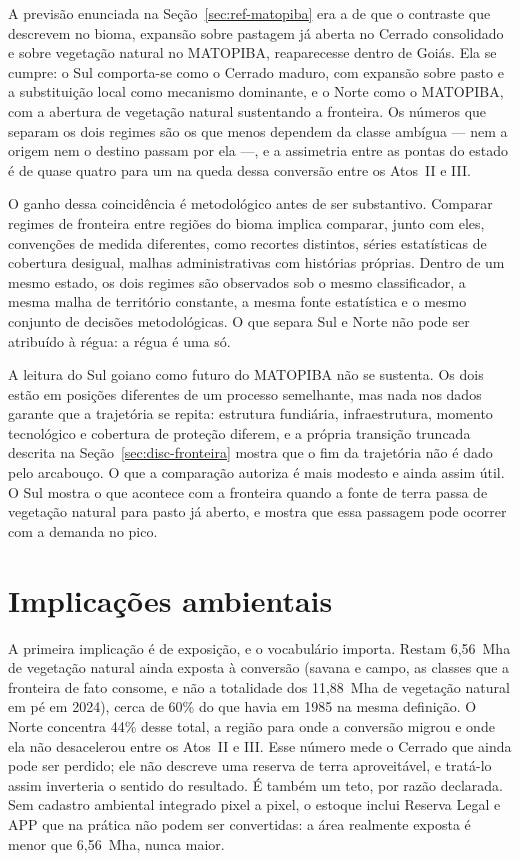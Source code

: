 A previsão enunciada na Seção~\ref{sec:ref-matopiba} era a de que o contraste
que  descrevem no bioma, expansão sobre pastagem
já aberta no Cerrado consolidado e sobre vegetação natural no MATOPIBA,
reaparecesse dentro de Goiás. Ela se cumpre: o Sul comporta-se como o Cerrado
maduro, com expansão sobre pasto e a substituição local como mecanismo
dominante, e o Norte como o MATOPIBA, com a abertura de vegetação natural
sustentando a fronteira. Os números que separam os dois regimes são os que
menos dependem da classe ambígua --- nem a origem nem o destino passam por ela
---, e a assimetria entre as pontas do estado é de quase quatro para um na
queda dessa conversão entre os Atos~II e III.

O ganho dessa coincidência é metodológico antes de ser substantivo. Comparar
regimes de fronteira entre regiões do bioma implica comparar, junto com eles,
convenções de medida diferentes, como recortes distintos, séries estatísticas
de cobertura desigual, malhas administrativas com histórias próprias. Dentro
de um mesmo estado, os dois regimes são observados sob o mesmo classificador,
a mesma malha de território constante, a mesma fonte estatística e o mesmo
conjunto de decisões metodológicas. O que separa Sul e Norte não pode ser
atribuído à régua: a régua é uma só.

A leitura do Sul goiano como futuro do MATOPIBA não se sustenta. Os dois estão
em posições diferentes de um processo semelhante, mas nada nos dados garante
que a trajetória se repita: estrutura fundiária, infraestrutura, momento
tecnológico e cobertura de proteção diferem, e a própria transição truncada
descrita na Seção~\ref{sec:disc-fronteira} mostra que o fim da trajetória não
é dado pelo arcabouço. O que a comparação autoriza é mais modesto e ainda
assim útil. O Sul mostra o que acontece com a fronteira quando a fonte de
terra passa de vegetação natural para pasto já aberto, e mostra que essa
passagem pode ocorrer com a demanda no pico.

\section{Implicações ambientais}
\label{sec:disc-ambiental}

A primeira implicação é de exposição, e o vocabulário importa. Restam 6,56~Mha
de vegetação natural ainda exposta à conversão (savana e campo, as classes que
a fronteira de fato consome, e não a totalidade dos 11,88~Mha de vegetação
natural em pé em 2024), cerca de 60\% do que havia em 1985 na mesma definição.
O Norte concentra 44\% desse total, a região para onde a conversão migrou e
onde ela não desacelerou entre os Atos~II e III. Esse número mede o Cerrado que ainda pode ser perdido;
ele não descreve uma reserva de terra aproveitável, e tratá-lo assim inverteria o sentido do resultado. É também um teto,
por razão declarada. Sem cadastro ambiental integrado pixel a pixel, o estoque
inclui Reserva Legal e APP que na prática não podem ser convertidas: a área
realmente exposta é menor que 6,56~Mha, nunca maior.

